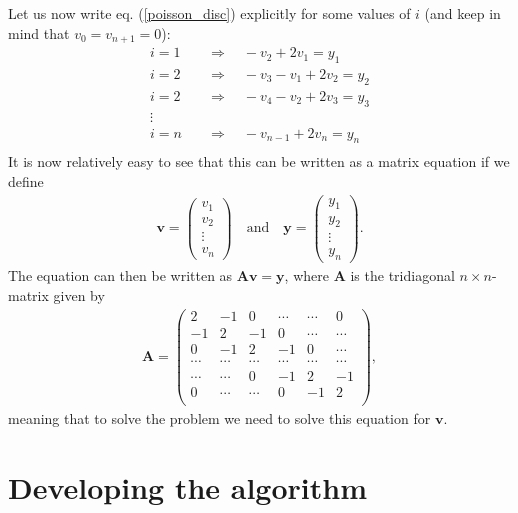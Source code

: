 \documentclass[12pt, a4paper]{article}
\begin{document}
Let us now write eq. (\ref{poisson_disc}) explicitly for some values of $i$ (and keep in mind that 
$v_0 = v_{n+1} = 0$): 
\begin{align*}
i = 1 \quad & \Rightarrow \quad -v_2 + 2v_1 = y_1 \\ 
i = 2 \quad & \Rightarrow \quad -v_3 - v_1 + 2v_2 = y_2 \\ 
i = 2 \quad & \Rightarrow \quad -v_4 - v_2 + 2v_3 = y_3 \\ 
\vdots \\
i = n \quad & \Rightarrow \quad  - v_{n-1} + 2v_n = y_n \\ 
\end{align*}
It is now relatively easy to see that this can be written as a matrix equation if we define 
\begin{align*}
\mathbf{v} = \left( \begin{array}{c}
v_1 \\ v_2 \\ \vdots \\ v_n
\end{array} \right) 
\quad \mbox{and} \quad
\mathbf{y} = \left( \begin{array}{c}
y_1 \\ y_2 \\ \vdots \\ y_n 
\end{array} \right) . 
\end{align*}
The equation can then be written as $\mathbf{Av} = \mathbf{y}$, where $\mathbf{A}$ is the 
tridiagonal $n\times n$-matrix given by 
\begin{align*}
\mathbf{A} = \left(\begin{array}{cccccc}
2 & -1 & 0 & \cdots & \cdots & 0 \\ 
-1 & 2 & -1 & 0 & \cdots & \cdots \\ 
0 & -1 & 2 & -1 & 0 & \cdots \\
\cdots & \cdots & \cdots & \cdots & \cdots & \cdots \\              
\cdots & \cdots  & 0 & -1 & 2 & -1 \\ 
0 & \cdots & \cdots & 0 & -1 & 2 \\  
\end{array} \right),  
\end{align*}
meaning that to solve the problem we need to solve this equation for $\mathbf{v}$. 

\section{Developing the algorithm}
\end{document}
